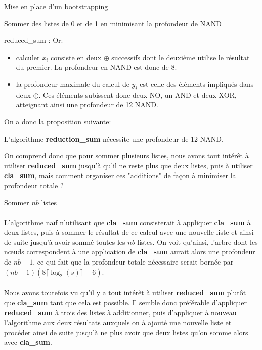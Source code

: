 \begin{section}{Mise en place d'un bootstrapping}
\begin{subsection}{Sommer des listes de 0 et de 1 en minimisant la profondeur de NAND}
\begin{subsubsection}{reduced\_sum :}
Or:
\begin{itemize}
\item calculer $x_i$ consiste en deux $\oplus$ successifs dont le deuxième utilise le résultat du premier. La profondeur en NAND est donc de 8. 
\item la profondeur maximale du calcul de $y_i$ est celle des éléments impliqués dans deux \nolinebreak
$\oplus$. Ces éléments subissent donc deux NO, un AND et deux XOR, atteignant ainsi une profondeur de 12 NAND.
\end{itemize}

On a donc la proposition suivante:
\begin{prop}
\label{reduction_sum}
	L'algorithme \textbf{reduction\_sum} nécessite une profondeur de 12 NAND.
\end{prop}

On comprend donc que pour sommer plusieurs listes, nous avons tout
intérêt à utiliser \textbf{reduced\_sum} jusqu'à qu'il ne reste plus
que deux listes, puis à utiliser \textbf{cla\_sum}, mais comment organiser ces "additions" de façon à minimiser la profondeur totale ?

\end{subsubsection}
\begin{subsubsection}{Sommer $nb$ listes}
\label{sec:sum_lists}
\paragraph{}
L'algorithme naïf n'utilisant que \textbf{cla\_sum} consisterait à appliquer
\textbf{cla\_sum} à deux listes, puis à sommer le résultat de ce calcul avec une nouvelle liste et ainsi de suite jusqu'à avoir sommé toutes les $nb$ listes.
On voit qu'ainsi, l'arbre dont les n\oe{}uds correspondent à une application de \textbf{cla\_sum}
aurait alors une profondeur de $nb - 1$, ce qui fait que la profondeur totale nécessaire serait 
bornée par $(nb-1)(8\lceil\log_2(s)\rceil + 6)$.

\paragraph{}
Nous avons toutefois vu qu'il y a tout intérêt à utiliser \textbf{reduced\_sum}
plutôt que \textbf{cla\_sum} tant que cela est possible.
Il semble donc préférable d'appliquer \textbf{reduced\_sum} à trois des listes à additionner,
puis d'appliquer à nouveau l'algorithme aux deux résultats auxquels on à ajouté une nouvelle liste et 
procéder ainsi de suite jusqu'à ne plus avoir que deux listes qu'on somme alors avec \textbf{cla\_sum}.


\end{subsubsection}
\end{subsection}
\end{section}
